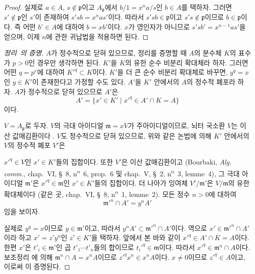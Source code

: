 \begin{proof}
실제로 $a\in A$, $s\notin\mathfrak p$이고
$A_{\mathfrak p}$에서 $b/1=x^na/s$인 $b\in A$를 택하자. 그러면
$s'\notin\mathfrak p$인 $s'$이 존재하여
$s'sb=x^nas'$이다. 따라서 $s'sb\in\mathfrak p$이고
$s's\notin\mathfrak p$이므로 $b\in\mathfrak p$이다. 즉 어떤
$b'\in A$에 대하여 $b=xb'$이다. $x$가 영인자가 아니므로
$s'sb'=x^{n-1}as'$을 얻으며, 이제 $n$에 관한 귀납법을 적용하면
된다.
\end{proof}

\begin{proof}[정리~{\rm{}}의 증명]
$A$가 정수적으로 닫혀 있으므로, 정리를 증명할 때 $A$의 분수체
$K$의 표수가 $p>0$인 경우만 생각하면 된다. $K'$을 $K$의 유한 순수
비분리 확대체라 하자. 그러면 어떤 $q=p^e$에 대하여
$K'^q\subset K$이다. $K'$을 더 큰 순수 비분리 확대체로 바꾸면,
$y^q=x$인 $y\in K'$이 존재한다고 가정할 수도 있다. $A'$을 $K'$
안에서의 $A$의 정수적 폐포라 하자. $A$가 정수적으로 닫혀 있으므로
$A'$은
\[
  A'=\{x'\in K'\mid x'^q\in A'\cap K=A\}
\]
이다.

$V=A_{\mathfrak p}$로 두자. $V$의 극대 아이디얼
$\mathfrak m=xV$가 주아이디얼이므로, 뇌터 국소환 $V$는 이산
값매김환이다 . $V$도 정수적으로 닫혀 있으므로,
위와 같은 논법에 의해 $K'$ 안에서의 $V$의 정수적 폐포 $V'$은


$x'^q\in V$인 $x'\in K'$들의 집합이다. 또한 $V'$은 이산
값매김환이고 (Bourbaki, \emph{Alg. comm.}, chap.~VI, §~8,
n\textsuperscript{o}~6, prop.~6 및 chap.~V, §~2,
n\textsuperscript{o}~3, lemme~4), 그 극대 아이디얼 $\mathfrak m'$은
$x'^q\in\mathfrak m$인 $x'\in K'$들의 집합이다. 더 나아가 잉여체
$V'/\mathfrak m'$은 $V/\mathfrak m$의 유한 확대체이다 (같은 곳,
chap.~VI, §~8, n\textsuperscript{o}~1, lemme~2). 모든 정수 $n>0$에
대하여
\begin{equation}
\label{0.23.1.3.2-ko}
  \mathfrak m'^n\cap A'=y^nA'
  \tag{23.1.3.2}
\end{equation}
임을 보이자.

실제로 $y^q=x$이므로 $y\in\mathfrak m'$이고, 따라서
$y^nA'\subset\mathfrak m'^n\cap A'$이다. 역으로
$x'\in\mathfrak m'^n\cap A'$이라 하고 $x'=z'y^n$인 $z'\in K'$을
택하자. 앞에서 본 바와 같이 $x'^q\in A'\cap K=A$이다. 한편 $x'$은
$t'_i\in\mathfrak m'$인 곱 $t'_1\cdots t'_n$들의 합이므로
$t_i'^q\in\mathfrak m$이다. 따라서
$x'^q\in\mathfrak m^n\cap A$이다. 보조정리
에 의해
$\mathfrak m^n\cap A=x^nA$이므로
$z'^qx^n\in x^nA$이다. $x\neq0$이므로 $z'^q\in A$이고, 이로써
이 증명된다.


\end{proof}
